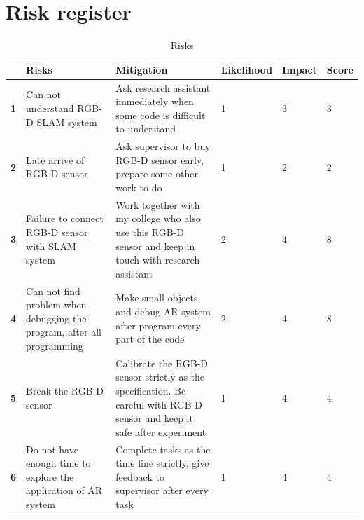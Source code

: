 \documentclass[a4paper,11pt]{article}
\begin{document}
\section{Risk register}


\begin{table}[!htp]
\caption{\label{tab:widgets}Risks}
\centering
\begin{tabular}{ | p{0.5cm}| p{4.5cm}|p{4cm} | p{1.9cm}| p{1.2cm} | p{1.2cm} | }

\hline
 &\textbf{Risks}&\textbf{Mitigation}&\textbf{Likelihood}&\textbf{Impact}&\textbf{Score}\\ 
\hline
\textbf{1}&Can not understand RGB-D SLAM system&Ask research assistant immediately when some code is difficult to understand&1&3&3\\ 
\hline
\textbf{2}&Late arrive of RGB-D sensor&Ask supervisor to buy RGB-D sensor early, prepare some other work to do&1&2&2\\ 
\hline
\textbf{3}&Failure to connect RGB-D sensor with SLAM system&Work together with my college who also use this RGB-D sensor and keep in touch with research assistant&2&4&8\\ 
\hline
\textbf{4}&Can not find problem when debugging the program, after all programming&Make small objects and debug AR system after program every part of the code&2&4&8\\ 
\hline
\textbf{5}&Break the RGB-D sensor&Calibrate the RGB-D sensor strictly as the specification. Be careful with RGB-D sensor and keep it safe after experiment &1&4&4\\ 
\hline
\textbf{6}&Do not have enough time to explore the application of AR system&Complete tasks as the time line strictly, give feedback to supervisor after every task &1&4&4\\ 
\hline
\end{tabular}
\end{table}


\newpage
\end{document}
